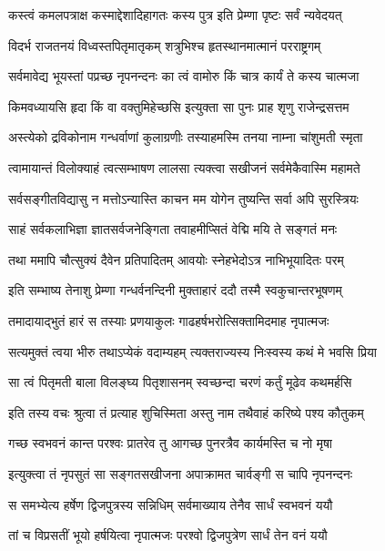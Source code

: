 \begin{center}
\twolineshloka
{कस्त्वं कमलपत्राक्ष कस्माद्देशादिहागतः}
{कस्य पुत्र इति प्रेम्णा पृष्टः सर्वं न्यवेदयत्} %

\twolineshloka
{विदर्भ राजतनयं विध्वस्तपितृमातृकम्}
{शत्रुभिश्च हृतस्थानमात्मानं परराष्ट्रगम्} %

\twolineshloka
{सर्वमावेद्य भूयस्तां पप्रच्छ नृपनन्दनः}
{का त्वं वामोरु किं चात्र कार्यं ते कस्य चात्मजा} %

\twolineshloka
{किमवध्यायसि हृदा किं वा वक्तुमिहेच्छसि}
{इत्युक्ता सा पुनः प्राह शृणु राजेन्द्रसत्तम} %

\twolineshloka
{अस्त्येको द्रविकोनाम गन्धर्वाणां कुलाग्रणीः}
{तस्याहमस्मि तनया नाम्ना चांशुमती स्मृता} %

\twolineshloka
{त्वामायान्तं विलोक्याहं त्वत्सम्भाषण लालसा}
{त्यक्त्वा सखीजनं सर्वमेकैवास्मि महामते} %

\twolineshloka
{सर्वसङ्गीतविद्यासु न मत्तोऽन्यास्ति काचन}
{मम योगेन तुष्यन्ति सर्वा अपि सुरस्त्रियः} %

\twolineshloka
{साहं सर्वकलाभिज्ञा ज्ञातसर्वजनेङ्गिता}
{तवाहमीप्सितं वेद्मि मयि ते सङ्गतं मनः} %

\twolineshloka
{तथा ममापि चौत्सुक्यं दैवेन प्रतिपादितम्}
{आवयोः स्नेहभेदोऽत्र नाभिभूयादितः परम्} %

\twolineshloka
{इति सम्भाष्य तेनाशु प्रेम्णा गन्धर्वनन्दिनी}
{मुक्ताहारं ददौ तस्मै स्वकुचान्तरभूषणम्} %

\twolineshloka
{तमादायाद्भुतं हारं स तस्याः प्रणयाकुलः}
{गाढहर्षभरोत्सिक्तामिदमाह नृपात्मजः} %

\twolineshloka
{सत्यमुक्तं त्वया भीरु तथाऽप्येकं वदाम्यहम्}
{त्यक्तराज्यस्य निःस्वस्य कथं मे भवसि प्रिया} %

\twolineshloka
{सा त्वं पितृमती बाला विलङ्घ्य पितृशासनम्}
{स्वच्छन्दा चरणं कर्तुं मूढेव कथमर्हसि} %

\twolineshloka
{इति तस्य वचः श्रुत्वा तं प्रत्याह शुचिस्मिता}
{अस्तु नाम तथैवाहं करिष्ये पश्य कौतुकम्} %

\twolineshloka
{गच्छ स्वभवनं कान्त परश्वः प्रातरेव तु}
{आगच्छ पुनरत्रैव कार्यमस्ति च नो मृषा} %

\twolineshloka
{इत्युक्त्वा तं नृपसुतं सा सङ्गतसखीजना}
{अपाक्रामत चार्वङ्गी स चापि नृपनन्दनः} %

\twolineshloka
{स समभ्येत्य हर्षेण द्विजपुत्रस्य सन्निधिम्}
{सर्वमाख्याय तेनैव सार्धं स्वभवनं ययौ} %

\twolineshloka
{तां च विप्रसतीं भूयो हर्षयित्वा नृपात्मजः}
{परश्वो द्विजपुत्रेण सार्धं तेन वनं ययौ} %


\end{center}
